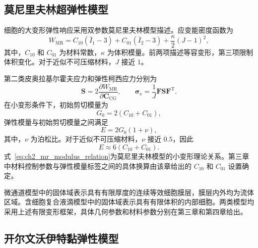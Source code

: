 \subsection{莫尼里夫林超弹性模型}

细胞的大变形弹性响应采用双参数莫尼里夫林模型描述。应变能密度函数为
\begin{equation}
W_{\mathrm{MR}}
=
C_{10}\left(\bar I_1-3\right)
+
C_{01}\left(\bar I_2-3\right)
+
\frac{\kappa}{2}\left(J-1\right)^2,
\label{eq:ch2_mooney_rivlin}
\end{equation}
其中，$C_{10}$ 和 $C_{01}$ 为材料常数，$\kappa$ 为体积模量。前两项描述等容变形，第三项限制体积变化。对于近似不可压缩材料，$J$ 接近 $1$\cite{mooney1940large,rivlin1948large}。

第二类皮奥拉基尔霍夫应力和弹性柯西应力分别为
\begin{equation}
\boldsymbol{S}
=
2\frac{\partial W_{\mathrm{MR}}}{\partial\boldsymbol{C}_{\mathrm{CG}}},
\qquad
\boldsymbol{\sigma}_{\mathrm e}
=
\frac{1}{J}
\boldsymbol{F}\boldsymbol{S}\boldsymbol{F}^{\mathrm T}.
\label{eq:ch2_hyperelastic_stress}
\end{equation}
在小变形条件下，初始剪切模量为
\begin{equation}
G_0
=
2\left(C_{10}+C_{01}\right),
\label{eq:ch2_initial_shear_modulus}
\end{equation}
弹性模量与初始剪切模量之间满足
\begin{equation}
E
=
2G_0(1+\nu),
\label{eq:ch2_elastic_shear_relation}
\end{equation}
其中，$\nu$ 为泊松比。对于近似不可压缩材料，$\nu$ 接近 $0.5$，因此
\begin{equation}
E
\approx
6\left(C_{10}+C_{01}\right).
\label{eq:ch2_mr_modulus_relation}
\end{equation}
式~\eqref{eq:ch2_mr_modulus_relation}为莫尼里夫林模型的小变形理论关系。第三章中材料控制参数与弹性模量标签之间的具体换算由该章给出的 $C_{10}$ 和 $C_{01}$ 设置确定。

微通道模型中的固体域表示具有有限厚度的连续等效细胞膜层，膜层内外均为流体区域。含细胞复合液滴模型中的固体域表示具有有限体积的内部细胞。两类模型均采用上述有限变形框架，具体几何参数和材料参数分别在第三章和第四章给出。

\subsection{开尔文沃伊特黏弹性模型}

